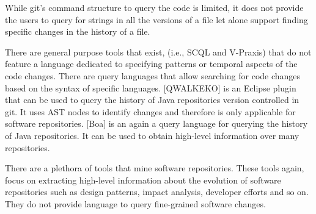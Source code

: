 
While git's command structure to query the code is limited, it does not provide the users to query for strings in all the versions of a file let alone support finding specific changes in the history of a file.

There are general purpose tools that exist, (i.e., SCQL and V-Praxis) that do not feature a language dedicated to specifying patterns or temporal aspects of the code changes. There are query languages that allow searching for code changes based on the syntax of specific languages. [QWALKEKO] is an Eclipse plugin that can be used to query the history of Java repositories version controlled in git. It uses AST nodes to identify changes and therefore is only applicable for software repositories. [Boa] is an again a query language for querying the history of Java repositories. It can be used to obtain high-level information over many repositories.

There are a plethora of tools that mine software repositories. These tools again, focus on extracting high-level information about the evolution of software repositories such as design patterns, impact analysis, developer efforts and so on. They do not provide language to query fine-grained software changes.
